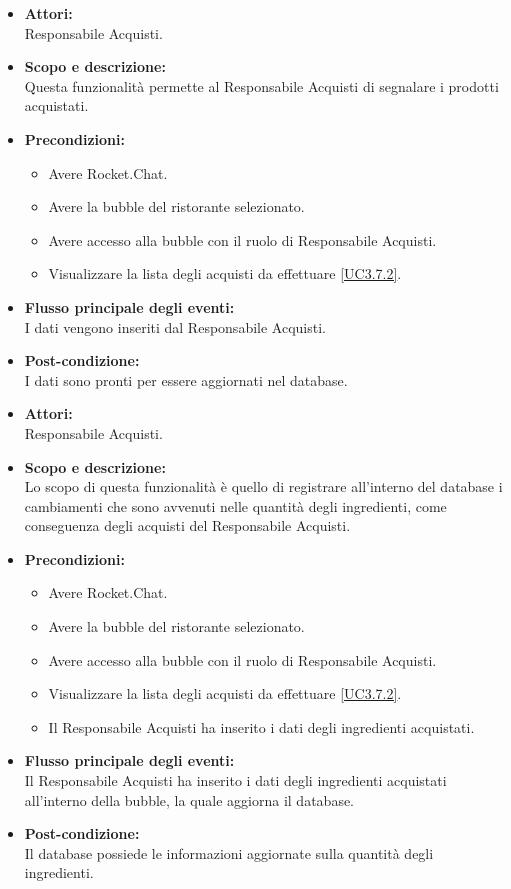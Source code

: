 
\begin{itemize}
	\item \textbf{Attori:}
	\\Responsabile Acquisti.
	\item \textbf{Scopo e descrizione:} 
	\\Questa funzionalità permette al Responsabile Acquisti di segnalare i prodotti acquistati.
	\item \textbf{Precondizioni:}
	\begin{itemize}
		\item Avere Rocket.Chat.
		\item Avere la bubble del ristorante selezionato.
		\item Avere accesso alla bubble con il ruolo di Responsabile Acquisti.
		\item Visualizzare la lista degli acquisti da effettuare \ref{UC3.7.2}.
	\end{itemize}
	\item \textbf{Flusso principale degli eventi:}
	\\I dati vengono inseriti dal Responsabile Acquisti.
	\item \textbf{Post-condizione:}
	\\I dati sono pronti per essere aggiornati nel database.
\end{itemize}


\begin{itemize}
	\item \textbf{Attori:}
	\\Responsabile Acquisti.
	\item \textbf{Scopo e descrizione:} 
	\\Lo scopo di questa funzionalità è quello di registrare all'interno del database i cambiamenti che sono avvenuti nelle quantità degli ingredienti, come conseguenza degli acquisti del Responsabile Acquisti.
	\item \textbf{Precondizioni:}
	\begin{itemize}
		\item Avere Rocket.Chat.
		\item Avere la bubble del ristorante selezionato.
		\item Avere accesso alla bubble con il ruolo di Responsabile Acquisti.
		\item Visualizzare la lista degli acquisti da effettuare \ref{UC3.7.2}.
		\item Il Responsabile Acquisti ha inserito i dati degli ingredienti acquistati.
	\end{itemize}
	\item \textbf{Flusso principale degli eventi:}
	\\Il Responsabile Acquisti ha inserito i dati degli ingredienti acquistati all'interno della bubble, la quale aggiorna il database.
	\item \textbf{Post-condizione:}
	\\Il database possiede le informazioni aggiornate sulla quantità degli ingredienti.
\end{itemize}